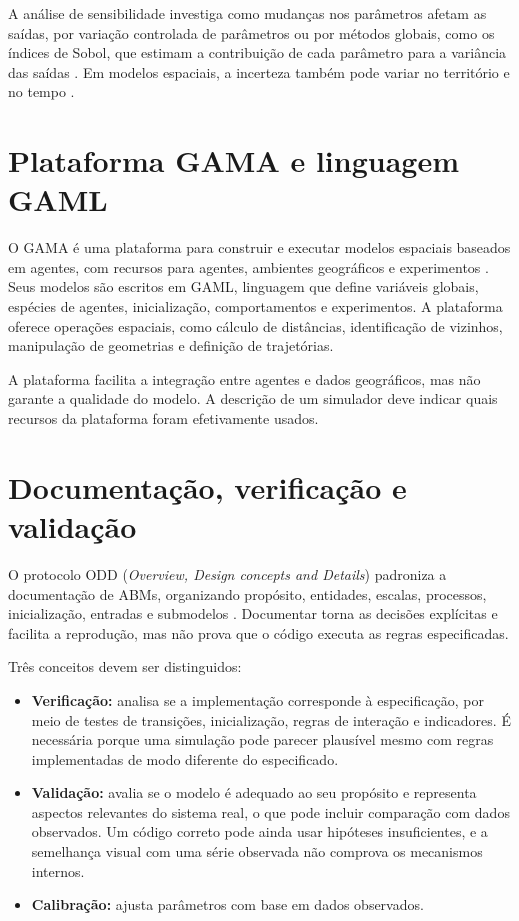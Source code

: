 A análise de sensibilidade investiga como mudanças nos parâmetros afetam as saídas, por variação controlada de parâmetros ou por métodos globais, como os índices de Sobol, que estimam a contribuição de cada parâmetro para a variância das saídas \cite{sobol_2001}. Em modelos espaciais, a incerteza também pode variar no território e no tempo \cite{gamal_etal_2025}.

\section{Plataforma GAMA e linguagem GAML}

O GAMA é uma plataforma para construir e executar modelos espaciais baseados em agentes, com recursos para agentes, ambientes geográficos e experimentos \cite{Taillandier2019}. Seus modelos são escritos em GAML, linguagem que define variáveis globais, espécies de agentes, inicialização, comportamentos e experimentos. A plataforma oferece operações espaciais, como cálculo de distâncias, identificação de vizinhos, manipulação de geometrias e definição de trajetórias.

A plataforma facilita a integração entre agentes e dados geográficos, mas não garante a qualidade do modelo. A descrição de um simulador deve indicar quais recursos da plataforma foram efetivamente usados.

\section{Documentação, verificação e validação}

O protocolo ODD (\textit{Overview, Design concepts and Details}) padroniza a documentação de ABMs, organizando propósito, entidades, escalas, processos, inicialização, entradas e submodelos \cite{grimm_etal_2020}. Documentar torna as decisões explícitas e facilita a reprodução, mas não prova que o código executa as regras especificadas.

Três conceitos devem ser distinguidos:

\begin{itemize}
    \item \textbf{Verificação:} analisa se a implementação corresponde à especificação, por meio de testes de transições, inicialização, regras de interação e indicadores. É necessária porque uma simulação pode parecer plausível mesmo com regras implementadas de modo diferente do especificado.
    \item \textbf{Validação:} avalia se o modelo é adequado ao seu propósito e representa aspectos relevantes do sistema real, o que pode incluir comparação com dados observados. Um código correto pode ainda usar hipóteses insuficientes, e a semelhança visual com uma série observada não comprova os mecanismos internos.
    \item \textbf{Calibração:} ajusta parâmetros com base em dados observados.
\end{itemize}


